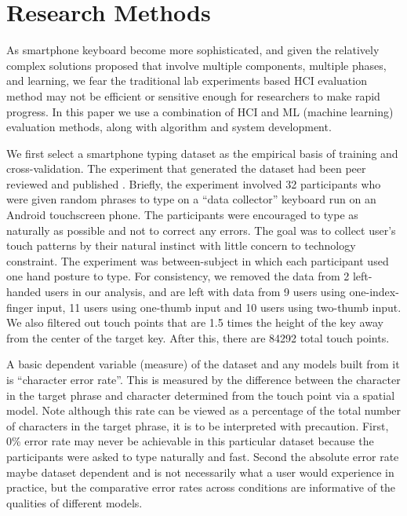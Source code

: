 \documentclass{sigchi}
\begin{document}
\section{Research Methods}
As smartphone keyboard become more sophisticated, and given the relatively complex solutions proposed that involve multiple components, multiple phases, and learning,  we fear the traditional lab experiments based HCI evaluation method may not be efficient or sensitive enough for researchers to make rapid progress. In this paper we use a combination of HCI and ML (machine learning) evaluation methods, along with algorithm and system development. 

We first select a smartphone typing dataset as the empirical basis of training 
and cross-validation. The experiment that generated the dataset had been peer 
reviewed and published \cite{Azenkot:2012}. Briefly, the experiment involved 32
participants who were given random phrases to type on a ``data collector''
keyboard run on an Android touchscreen phone.  The participants were encouraged 
to type as naturally as possible and not to correct any errors. The goal was to 
collect user’s touch patterns by their natural instinct with little concern to 
technology constraint. The experiment was between-subject in which each 
participant used one hand posture to type. For consistency, we removed the data 
from 2 left-handed users in our analysis, and are left with data from 9 users 
using one-index-finger input, 11 users using one-thumb input and 10 users using 
two-thumb input.  We also 
filtered out touch points that are 1.5 times the height of the key away from 
the center of the target key. After this, there are 84292 total touch points.
 
A basic dependent variable (measure) of the dataset and any models built from it
is ``character error rate''. This is measured by the difference between the
character in the target phrase and character determined from the touch point via
a spatial model. Note although this rate can be viewed as a percentage of the 
total number of characters in the target phrase, it is to be interpreted with 
precaution. First, 0\% error rate may never be achievable in this
particular dataset because the participants were asked to type naturally and
fast. Second the absolute error rate maybe dataset dependent and is not
necessarily what a user would experience in practice, but the comparative error rates across conditions are informative of the qualities 
of different models.
\end{document}
